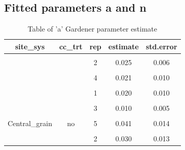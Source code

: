 \documentclass[
]{article}
\begin{document}
\hypertarget{fitted-parameters-a-and-n}{%
\subsection{Fitted parameters a and n}\label{fitted-parameters-a-and-n}}

\begin{table}[H]

\caption{\label{tab:paramsalp}Table of 'a' Gardener parameter estimate}
\centering
\begin{tabular}[t]{ccccc}
\toprule
site\_sys & cc\_trt & rep & estimate & std.error\\
\midrule
\cellcolor{gray!6}{} & \cellcolor{gray!6}{} & \cellcolor{gray!6}{1} & \cellcolor{gray!6}{0.043} & \cellcolor{gray!6}{0.010}\\

 &  & 2 & 0.025 & 0.006\\

\cellcolor{gray!6}{} & \cellcolor{gray!6}{} & \cellcolor{gray!6}{3} & \cellcolor{gray!6}{0.015} & \cellcolor{gray!6}{0.012}\\

 &  & 4 & 0.021 & 0.010\\

\cellcolor{gray!6}{} & \cellcolor{gray!6}{\multirow{-5}{*}{\centering\arraybackslash cc}} & \cellcolor{gray!6}{5} & \cellcolor{gray!6}{0.002} & \cellcolor{gray!6}{0.001}\\

 &  & 1 & 0.020 & 0.010\\

\cellcolor{gray!6}{} & \cellcolor{gray!6}{} & \cellcolor{gray!6}{2} & \cellcolor{gray!6}{0.025} & \cellcolor{gray!6}{0.009}\\

 &  & 3 & 0.010 & 0.005\\

\cellcolor{gray!6}{} & \cellcolor{gray!6}{} & \cellcolor{gray!6}{4} & \cellcolor{gray!6}{0.013} & \cellcolor{gray!6}{0.007}\\

\multirow{-10}{*}{\centering\arraybackslash Central\_grain} & \multirow{-5}{*}{\centering\arraybackslash no} & 5 & 0.041 & 0.014\\
\cmidrule{1-5}
\cellcolor{gray!6}{} & \cellcolor{gray!6}{} & \cellcolor{gray!6}{1} & \cellcolor{gray!6}{0.028} & \cellcolor{gray!6}{0.014}\\

 &  & 2 & 0.030 & 0.013\\


\end{tabular}
\end{table}
\end{document}
